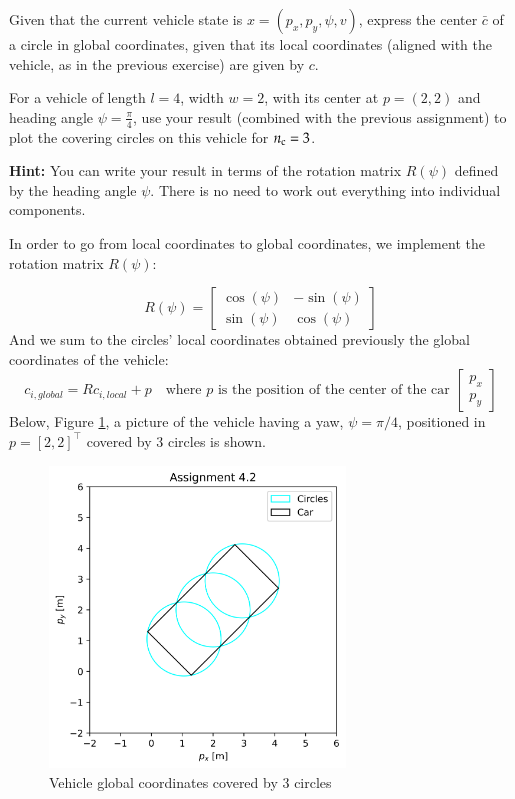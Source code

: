 \documentclass[]{article}
\begin{document}
\begin{assignment}
	Given that the current vehicle state is $x = (p_x, p_y, \psi, v)$, 
	express the center $\bar{c}$ of a circle in global coordinates, given that its local coordinates 
	(aligned with the vehicle, as in the previous exercise) are given by $c$.

	For a vehicle of length $l = 4$, width $w = 2$, with its center at $p = (2,2)$
	and heading angle $\psi = \tfrac{\pi}{4}$, use your result (combined with the previous assignment) to plot the 
	covering circles on this vehicle for $n_{\mathrm{c}} = 3$.

	\textbf{Hint:} You can write your result in terms of the rotation matrix $R(\psi)$ defined by 
	the heading angle $\psi$. There is no need to work out everything into individual components.
\end{assignment}
\begin{flushleft}
	In order to go from local coordinates to global coordinates, we implement the rotation matrix $R(\psi)$:
\end{flushleft}
\[
	R(\psi) = \begin{bmatrix}
		\cos(\psi) & -\sin(\psi) \\
		\sin(\psi) & \cos(\psi)
	\end{bmatrix}
\]
And we sum to the circles' local coordinates obtained previously the global coordinates of the vehicle:
\[
	c_{i,global} = R c_{i,local} + p \quad \text{where } p \text{ is the position of the center of the car } 
	\begin{bmatrix}
		p_x \\ p_y
	\end{bmatrix}
\]
Below, Figure \ref{fig:assignment4_2}, a picture of the vehicle having a yaw, $ \psi = \pi/4 $, positioned in $	p = [2, 2]^\top $ covered by 3 circles is shown.
\begin{figure}[H]
    \centering
    \includegraphics[width=0.7\textwidth]{images/Assignment_42.png}
    \caption{Vehicle global coordinates covered by 3 circles}
    \label{fig:assignment4_2}
\end{figure}
\end{document}
